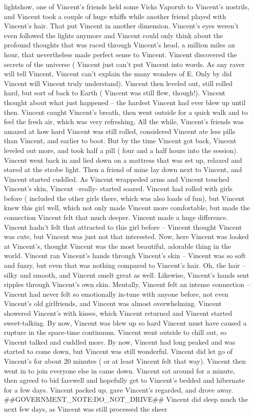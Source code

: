 \documentclass[12pt]{book}
\begin{document}
lightshow, one of Vincent's friends held some Vicks Vaporub to Vincent's nostrils, and Vincent took a couple of huge whiffs while another friend played with Vincent's hair. That put Vincent in another dimension. Vincent's eyes weren't even followed the lights anymore and Vincent could only think about the profound thoughts that was raced through Vincent's head, a million miles an hour, that nevertheless made perfect sense to Vincent. Vincent discovered the secrets of the universe ( Vincent just can't put Vincent into words. As any raver will tell Vincent, Vincent can't explain the many wonders of E. Only by did Vincent will Vincent truly understand). Vincent then leveled out, still rolled hard, but sort of back to Earth ( Vincent was still flew, though!). Vincent thought about what just happened -- the hardest Vincent had ever blew up until then. Vincent caught Vincent's breath, then went outside for a quick walk and to feel the fresh air, which was very refreshing. All the while, Vincent's friends was amazed at how hard Vincent was still rolled, considered Vincent ate less pills than Vincent, and earlier to boot. But by the time Vincent got back, Vincent leveled out more, and took half a pill ( four and a half hours into the session). Vincent went back in and lied down on a mattress that was set up, relaxed and stared at the strobe light. Then a friend of mine lay down next to Vincent, and Vincent started cuddled. As Vincent wrappeded arms and Vincent touched Vincent's skin, Vincent --really- started soared. Vincent had rolled with girls before ( included the other girls there, which was also loads of fun), but Vincent knew this girl well, which not only made Vincent more comfortable, but made the connection Vincent felt that much deeper. Vincent made a huge difference. Vincent hadn't felt that attracted to this girl before -- Vincent thought Vincent was cute, but Vincent was just not that interested. Now, here Vincent was looked at Vincent's, thought Vincent was the most beautiful, adorable thing in the world. Vincent ran Vincent's hands through Vincent's skin -- Vincent was so soft and fuzzy, but even that was nothing compared to Vincent's hair. Oh, the hair -- silky and smooth, and Vincent smelt great as well. Likewise, Vincent's hands sent ripples through Vincent's own skin. Mentally, Vincent felt an intense connection -- Vincent had never felt so emotionally in-tune with anyone before, not even Vincent's old girlfriends, and Vincent was almost overwhelming. Vincent showered Vincent's with kisses, which Vincent returned and Vincent started sweet-talking. By now, Vincent was blew up so hard Vincent must have caused a rupture in the space-time continuum. Vincent went outside to chill out, so Vincent talked and cuddled more. By now, Vincent had long peaked and was started to come down, but Vincent was still wonderful. Vincent did let go of Vincent's for about 20 minutes ( or at least Vincent felt that way). Vincent then went in to join everyone else in came down. Vincent sat around for a minute, then agreed to bid farewell and hopefully get to Vincent's bedded and hibernate for a few days. Vincent packed up, gave Vincent's regarded, and drove away. \#\#GOVERNMENT\_NOTE:DO\_NOT\_DRIVE\#\# Vincent did sleep much the next few days, as Vincent was still processed the sheer 
\end{document}
